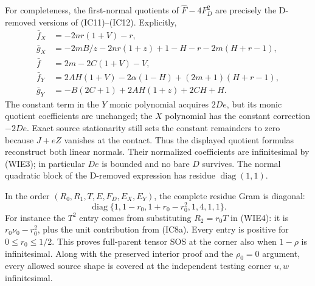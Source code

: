 For completeness, the first-normal quotients of
$\widehat F-4F_D^2$ are precisely the D-removed versions of
(IC11)--(IC12). Explicitly,
\begin{align*}
 \bar f_X&=-2nr(1+V)-r,\\
 \bar g_X&=-2mB/z-2nr(1+z)+1-H-r-2m(H+r-1),\\
 \bar f&=2m-2C(1+V)-V,\\
 \bar f_Y&=2AH(1+V)-2\alpha(1-H)+(2m+1)(H+r-1),\\
 \bar g_Y&=-B(2C+1)+2AH(1+z)+2CH+H.
\end{align*}
The constant term in the $Y$ monic polynomial acquires $2De$, but
its monic quotient coefficients are unchanged; the $X$ polynomial
has the constant correction $-2De$. Exact source stationarity
still sets the constant remainders to zero because $J+eZ$ vanishes
at the contact. Thus the displayed quotient formulas reconstruct
both linear normals. Their normalized coefficients are infinitesimal
by (WIE3); in particular $De$ is bounded and no bare $D$ survives.
The normal quadratic block of the D-removed expression has residue
$\operatorname{diag}(1,1)$.

In the order $(R_0,R_1,T,E,F_D,E_X,E_Y)$, the complete residue Gram
is diagonal:
\[
 \operatorname{diag}\{1,1-r_0,1+r_0-r_0^2,1,4,1,1\}.
\tag{WIE6}
\]
For instance the $T^2$ entry comes from substituting $R_2=r_0T$
in (WIE4): it is $r_0\nu_0-r_0^2$, plus the unit contribution from
(IC8a). Every entry is positive for $0\le r_0\le1/2$.
This proves full-parent tensor SOS at the corner also when
$1-\rho$ is infinitesimal. Along with the preserved interior proof
and the $\rho_0=0$ argument, every allowed source shape is covered
at the independent testing corner $u,w$ infinitesimal.
